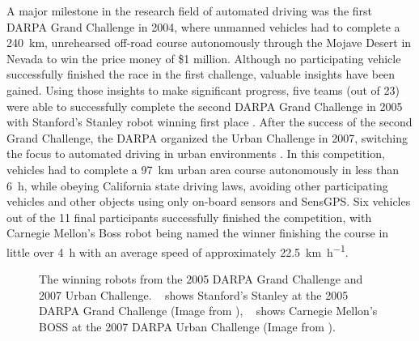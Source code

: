 A major milestone in the research field of automated driving was the first \ac{DARPA} Grand Challenge in 2004, where unmanned vehicles had to complete a \SI{240}{\kilo\meter}, unrehearsed off-road course autonomously through the Mojave Desert in Nevada to win the price money of \$1 million.
Although no participating vehicle successfully finished the race \cite{Bacha2004} in the first challenge, valuable insights have been gained.
Using those insights to make significant progress, five teams (out of 23) were able to successfully complete the second \ac{DARPA} Grand Challenge in 2005 with Stanford's Stanley robot winning first place \cite{Thrun2006}.
After the success of the second Grand Challenge, the \ac{DARPA} organized the Urban Challenge in 2007, switching the focus to automated driving in urban environments \cite{Buehler2009}.
In this competition, vehicles had to complete a \SI{97}{\kilo\meter} urban area course autonomously in less than \SI{6}{\hour}, while obeying California state driving laws, avoiding other participating vehicles and other objects using only on-board sensors and \ac{SensGPS}.
Six vehicles out of the 11 final participants successfully finished the competition, with Carnegie Mellon's Boss robot \cite{Urmson.2008} being named the winner finishing the course in little over \SI{4}{\hour} with an average speed of approximately \SI[per-mode=symbol]{22.5}{\kilo\meter\per\hour}.

\begin{figure}[t!]
	\centering
	\caption{The winning robots from the 2005 \ac{DARPA} Grand Challenge and 2007 Urban Challenge. ~\protect{} shows Stanford's Stanley at the 2005 \ac{DARPA} Grand Challenge (Image from \cite{Thrun2006}), ~\protect{} shows Carnegie Mellon's BOSS at the 2007 \ac{DARPA} Urban Challenge (Image from \cite{Urmson.2008}).}\label{fig:darpa_chal}
\end{figure}

